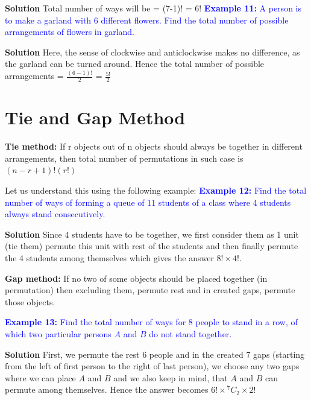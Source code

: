 \documentclass[12pt, a4paper]{article}
\begin{document}
\textbf{Solution} Total number of ways will be = (7-1)! = 6!\newline
\textcolor{blue}{\textbf{Example 11:} A person is to make a garland with 6 different flowers. Find the total number of possible arrangements of flowers in garland.}

\textbf{Solution} Here, the sense of clockwise and anticlockwise makes no difference, as the garland can be turned around. Hence the total number of possible arrangements = $\frac{(6-1)!}{2}$ = $\frac{5!}{2}$
\section{Tie and Gap Method}
\begin{tcolorbox}[colback=ProcessBlue!10!White,colframe=Blue!60!White]
\textbf{Tie method:} If r objects out of n objects should always be together in different arrangements, then total number of permutations in such case is $(n-r+1)!(r!)$
\end{tcolorbox}
Let us understand this using the following example:\newline
\textcolor{blue}{\textbf{Example 12:} Find the total number of ways of forming a queue of 11 students of a class where 4 students always stand consecutively.}

\textbf{Solution} Since 4 students have to be together, we first consider them as 1 unit (tie them) permute this unit with rest of the students and then finally permute the 4 students among themselves which gives the answer $8! \times 4!$.
\begin{tcolorbox}[colback=ProcessBlue!10!White,colframe=Blue!60!White]
\textbf{Gap method:} If no two of some objects should be placed together (in permutation) then excluding them, permute rest and in created gaps, permute those objects.
\end{tcolorbox}
\textcolor{blue}{\textbf{Example 13:} Find the total number of ways for 8 people to stand in a row, of which two particular persons $A$ and $B$ do not stand together.}

\textbf{Solution} First, we permute the rest 6 people and in the created 7 gaps (starting from the left of first person to the right of last person), we choose any two gaps where we can place $A$ and $B$ and we also keep in mind, that $A$ and $B$ can permute among themselves. Hence the answer becomes $6! \times {^7C_2}\times 2!$
\end{document}

